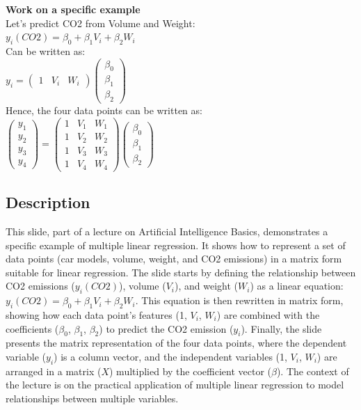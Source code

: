 \documentclass{article}%
\begin{document}
\textbf{Work on a specific example} \\
Let's predict CO2 from Volume and Weight: \\
$y_i(CO2) = \beta_0 + \beta_1 V_i + \beta_2 W_i$ \\
Can be written as: \\
$y_i = \begin{pmatrix} 1 & V_i & W_i \end{pmatrix} \begin{pmatrix} \beta_0 \\ \beta_1 \\ \beta_2 \end{pmatrix}$ \\
Hence, the four data points can be written as: \\
$\begin{pmatrix} y_1 \\ y_2 \\ y_3 \\ y_4 \end{pmatrix} = \begin{pmatrix} 1 & V_1 & W_1 \\ 1 & V_2 & W_2 \\ 1 & V_3 & W_3 \\ 1 & V_4 & W_4 \end{pmatrix} \begin{pmatrix} \beta_0 \\ \beta_1 \\ \beta_2 \end{pmatrix}$
%
\subsection{Description}%
This slide, part of a lecture on Artificial Intelligence Basics, demonstrates a specific example of multiple linear regression.  It shows how to represent a set of data points (car models, volume, weight, and CO2 emissions) in a matrix form suitable for linear regression.  The slide starts by defining the relationship between CO2 emissions ($y_i(CO2)$), volume ($V_i$), and weight ($W_i$) as a linear equation: $y_i(CO2) = \beta_0 + \beta_1 V_i + \beta_2 W_i$.  This equation is then rewritten in matrix form, showing how each data point's features (1, $V_i$, $W_i$) are combined with the coefficients ($\beta_0$, $\beta_1$, $\beta_2$) to predict the CO2 emission ($y_i$).  Finally, the slide presents the matrix representation of the four data points, where the dependent variable ($y_i$) is a column vector, and the independent variables (1, $V_i$, $W_i$) are arranged in a matrix ($X$) multiplied by the coefficient vector ($\beta$).  The context of the lecture is on the practical application of multiple linear regression to model relationships between multiple variables.%
\end{document}
